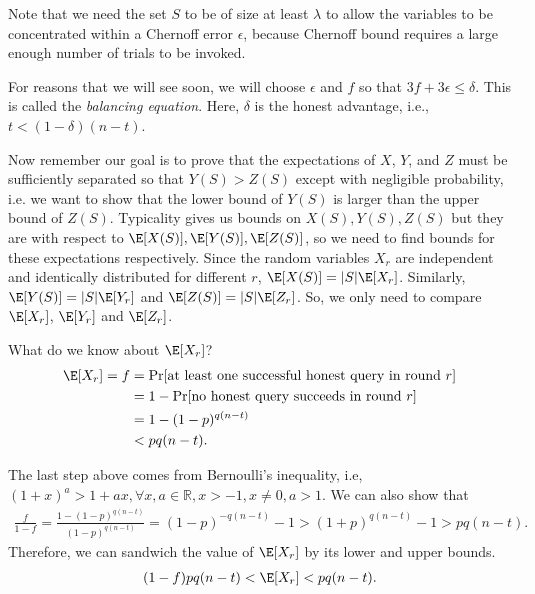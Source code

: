 Note that we need the set $S$ to be of size at least $\lambda$ to allow the variables to be concentrated within a Chernoff error $\epsilon$, because Chernoff bound requires a large enough number of trials to be invoked.

For reasons that we will see soon, we will choose $\epsilon$ and $f$ so that $3f + 3\epsilon \leq \delta$. This is called the \emph{balancing equation}. Here, $\delta$ is the honest advantage, i.e., $t < (1-\delta)(n-t)$.

Now remember our goal is to prove that the expectations of $X$, $Y$, and $Z$ must be sufficiently separated so that $Y(S) > Z(S)$ except with negligible probability, i.e. we want to show that the lower bound of $Y(S)$ is larger than the upper bound of $Z(S)$. Typicality gives us bounds on $X(S), Y(S), Z(S)$ but they are with respect to $\E[X(S)], \E[Y(S)], \E[Z(S)]$, so we need to find bounds for these expectations respectively.
Since the random variables $X_r$ are independent and identically distributed for different $r$, $\E[X(S)] = |S|\E[X_r]$. Similarly, $\E[Y(S)] = |S|\E[Y_r]$ and $\E[Z(S)] = |S|\E[Z_r]$. So, we only need to compare $\E[X_r]$, $\E[Y_r]$ and $\E[Z_r]$.

What do we know about $\E[X_r]$?
\begin{align}
    \E[X_r] = f &= \Pr [\text{at least one successful honest query in round $r$}] \nonumber \\
    & = 1 - \Pr [\text{no honest query succeeds in round $r$}] \nonumber \\
    & = 1 - (1-p)^{q(n-t)} \nonumber \\
    & < pq(n-t).
\end{align}

The last step above comes from Bernoulli's inequality, i.e,  $(1+x)^a > 1+ax, \forall x, a \in \mathbb{R}, x > -1, x \neq 0, a > 1$. We can also show that
\begin{align}
\label{eq.f_lower_bound}
    \frac{f}{1-f} = \frac{1-(1-p)^{q(n-t)}}{(1-p)^{q(n-t)}} = (1-p)^{-q(n-t)} -1 > (1+p)^{q(n-t)} - 1 > pq(n-t).
\end{align}
Therefore, we can sandwich the value of $\E[X_r]$ by its lower and upper bounds.
\begin{align}
    (1-f)pq(n-t) < \E[X_r] < pq(n-t).
\end{align}


